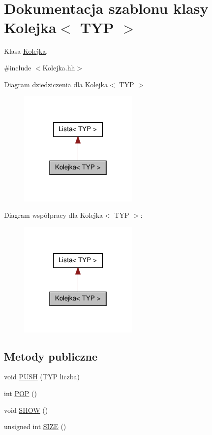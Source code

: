 \hypertarget{class_kolejka}{
\section{Dokumentacja szablonu klasy Kolejka$<$ TYP $>$}
\label{class_kolejka}
}


Klasa \hyperlink{class_kolejka}{Kolejka}.  




{\ttfamily \#include $<$Kolejka.hh$>$}



Diagram dziedziczenia dla Kolejka$<$ TYP $>$
\nopagebreak
\begin{figure}[H]
\begin{center}
\leavevmode
\includegraphics[width=166pt]{class_kolejka__inherit__graph}
\end{center}
\end{figure}


Diagram współpracy dla Kolejka$<$ TYP $>$:
\nopagebreak
\begin{figure}[H]
\begin{center}
\leavevmode
\includegraphics[width=166pt]{class_kolejka__coll__graph}
\end{center}
\end{figure}
\subsection*{Metody publiczne}
\begin{DoxyCompactItemize}
\item 
void \hyperlink{class_kolejka_a66056e67a0514466d7771da351e8468b}{PUSH} (TYP liczba)
\item 
int \hyperlink{class_kolejka_ab1d8e5d4a855fb2156201a57cc0a9a39}{POP} ()
\item 
void \hyperlink{class_kolejka_a26b5afbcc9f892a41acbd3aed062ee50}{SHOW} ()
\item 
unsigned int \hyperlink{class_kolejka_a06a7fe157ff434771a700ffd084dc7a2}{SIZE} ()
\end{DoxyCompactItemize}


